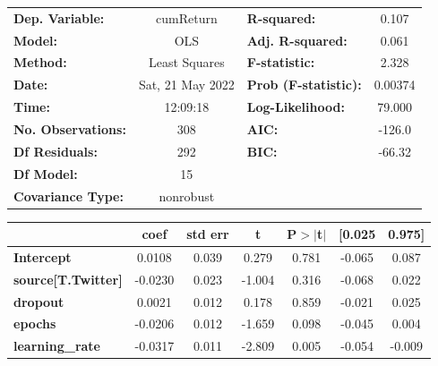 \begin{center}
\begin{tabular}{lclc}
\toprule
\textbf{Dep. Variable:}              &    cumReturn     & \textbf{  R-squared:         } &     0.107   \\
\textbf{Model:}                      &       OLS        & \textbf{  Adj. R-squared:    } &     0.061   \\
\textbf{Method:}                     &  Least Squares   & \textbf{  F-statistic:       } &     2.328   \\
\textbf{Date:}                       & Sat, 21 May 2022 & \textbf{  Prob (F-statistic):} &  0.00374    \\
\textbf{Time:}                       &     12:09:18     & \textbf{  Log-Likelihood:    } &    79.000   \\
\textbf{No. Observations:}           &         308      & \textbf{  AIC:               } &    -126.0   \\
\textbf{Df Residuals:}               &         292      & \textbf{  BIC:               } &    -66.32   \\
\textbf{Df Model:}                   &          15      & \textbf{                     } &             \\
\textbf{Covariance Type:}            &    nonrobust     & \textbf{                     } &             \\
\bottomrule
\end{tabular}
\begin{tabular}{lcccccc}
                                     & \textbf{coef} & \textbf{std err} & \textbf{t} & \textbf{P$> |$t$|$} & \textbf{[0.025} & \textbf{0.975]}  \\
\midrule
\textbf{Intercept}                   &       0.0108  &        0.039     &     0.279  &         0.781        &       -0.065    &        0.087     \\
\textbf{source[T.Twitter]}           &      -0.0230  &        0.023     &    -1.004  &         0.316        &       -0.068    &        0.022     \\
\textbf{dropout}                     &       0.0021  &        0.012     &     0.178  &         0.859        &       -0.021    &        0.025     \\
\textbf{epochs}                      &      -0.0206  &        0.012     &    -1.659  &         0.098        &       -0.045    &        0.004     \\
\textbf{learning\_rate}              &      -0.0317  &        0.011     &    -2.809  &         0.005        &       -0.054    &       -0.009     \\

\end{tabular}
\end{center}
